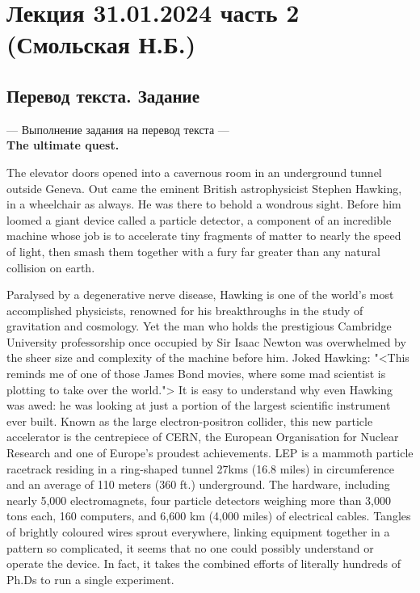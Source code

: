 \documentclass[main.tex]{subfiles}
\begin{document}
\section{Лекция 31.01.2024 часть 2 (Смольская Н.Б.)}

\subsection{Перевод текста. Задание}

--- Выполнение задания на перевод текста ---
\\

\textbf{The ultimate quest.}

The elevator doors opened into a cavernous room in an underground tunnel outside Geneva.
Out came the eminent British astrophysicist Stephen Hawking, in a wheelchair as always.
He was there to behold a wondrous sight.
Before him loomed a giant device called a particle detector, a component of an incredible machine whose job is to accelerate tiny fragments of matter to nearly the speed of light, then smash them together with a fury far greater than any natural collision on earth.

Paralysed by a degenerative nerve disease, Hawking is one of the world's most accomplished physicists, renowned for his breakthroughs in the study of gravitation and cosmology.
Yet the man who holds the prestigious Cambridge University professorship once occupied by Sir Isaac Newton was overwhelmed by the sheer size and complexity of the machine before him.
Joked Hawking: "<This reminds me of one of those James Bond movies, where some mad scientist is plotting to take over the world.">
It is easy to understand why even Hawking was awed: he was looking at just a portion of the largest scientific instrument ever built.
Known as the large electron-positron collider, this new particle accelerator is the centrepiece of CERN, the European Organisation for Nuclear Research and one of Europe's proudest achievements.
LEP is a mammoth particle racetrack residing in a ring-shaped tunnel 27kms (16.8 miles) in circumference and an average of 110 meters (360 ft.) underground.
The hardware, including nearly 5,000 electromagnets, four particle detectors weighing more than 3,000 tons each, 160 computers, and 6,600 km (4,000 miles) of electrical cables.
Tangles of brightly coloured wires sprout everywhere, linking equipment together in a pattern so complicated, it seems that no one could possibly understand or operate the device.
In fact, it takes the combined efforts of literally hundreds of Ph.Ds to run a single experiment.
\end{document}
